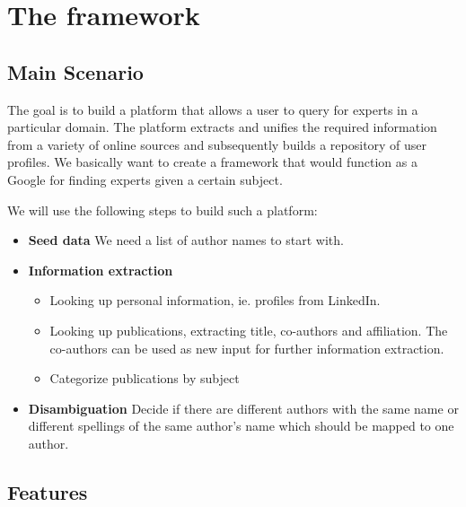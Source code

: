 \chapter{The framework}

\section{Main Scenario}

The goal is to build a platform that allows a user to query for experts in a particular domain. The
platform extracts and unifies the required information from a variety of online sources and
subsequently builds a repository of user profiles. We basically want to create a framework that would function as a Google for finding experts given a certain subject.

We will use the following steps to build such a platform:


\begin{itemize}
	\item \textbf{Seed data} We need a list of author names to start with.
	\item \textbf{Information extraction}
		\begin{itemize}
			\item Looking up personal information, ie. profiles from LinkedIn.
			\item Looking up publications, extracting title, co-authors and affiliation. The co-authors can be used as new input for further information extraction.
			\item Categorize publications by subject
		\end{itemize}
	\item \textbf{Disambiguation} Decide if there are different authors with the same name or different spellings of the same author's name which should be mapped to one author.
\end{itemize}


\section{Features}

